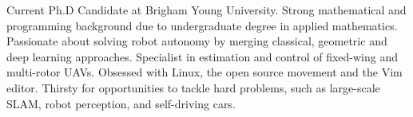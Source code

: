 

\begin{cvparagraph}

Current Ph.D Candidate at Brigham Young University. Strong mathematical and programming background due to undergraduate degree in applied mathematics. Passionate about solving robot autonomy by merging classical, geometric and deep learning approaches. Specialist in estimation and control of fixed-wing and multi-rotor UAVs. Obsessed with Linux, the open source movement and the Vim editor. Thirsty for opportunities to tackle hard problems, such as large-scale SLAM, robot perception, and self-driving cars.
\end{cvparagraph}
